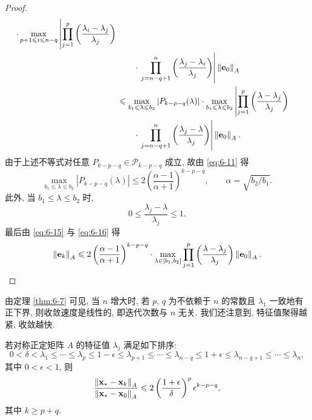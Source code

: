 \begin{proof}
\[\begin{aligned}
      \cdot\max_{p+1\leqslant i\leqslant n-q}\left|\prod_{j=1}^p
      \left(\frac{\lambda_i-\lambda_j}{\lambda_j}\right)\right.\\
    &\qquad\cdot\left.\prod_{j=n-q+1}^n
      \left(\frac{\lambda_j-\lambda_i}{\lambda_j}\right)\right|
      \left\|\mathbf{e}_0\right\|_A\\
    &\leqslant\max_{b_1\leqslant\lambda\leqslant b_2}
      \left|P_{k-p-q}(\lambda)\right|
      \cdot\max_{b_1\leqslant\lambda\leqslant b_2}\left|\prod_{j=1}^p
      \left(\frac{\lambda-\lambda_j}{\lambda_j}\right)\right.\\
    &\qquad\cdot\left.\prod_{j=n-q+1}^n
      \left(\frac{\lambda_j-\lambda}{\lambda_j}\right)\right|
      \left\|\mathbf{e}_0\right\|_A.
  \end{aligned}
\]
由于上述不等式对任意 $P_{k-p-q}\in\mathcal{P}_{k-p-q}$ 成立, 故由 \eqref{eq:6-11} 得
\begin{equation}
  \max_{b_1\leqslant\lambda\leqslant b_2}\left|P_{k-p-q}(\lambda)\right|
  \leqslant2\left(\frac{\alpha-1}{\alpha+1}\right)^{k-p-q},
  \qquad\alpha=\sqrt{b_2/b_1}.
  \label{eq:6-15}
\end{equation}
此外, 当 $b_1\leqslant\lambda\leqslant b_2$ 时,
\begin{equation}
  0\leqslant\frac{\lambda_j-\lambda}{\lambda_j}\leqslant1.
  \label{eq:6-16}
\end{equation}
最后由 \eqref{eq:6-15} 与 \eqref{eq:6-16} 得
\[
  \left\|\mathbf{e}_k\right\|_A
  \leqslant2\left(\frac{\alpha-1}{\alpha+1}\right)^{k-p-q}
  \cdot\max_{\lambda\in[b_1,b_2]}\prod_{j=1}^p
  \left(\frac{\lambda-\lambda_j}{\lambda_j}\right)\left\|\mathbf{e}_0\right\|_A.
  \qedhere
\]
\end{proof}

由定理 \ref{thm:6-7} 可见, 当 $n$ 增大时, 若 $p$, $q$ 为不依赖于 $n$ 的常数且 $\lambda_1$ 一致地有正下界, 则收敛速度是线性的, 即迭代次数与 $n$ 无关. 我们还注意到, 特征值聚得越紧, 收敛越快.

\begin{corollary}
\label{cor:6-1}
若对称正定矩阵 $A$ 的特征值 $\lambda_j$ 满足如下排序:
\[
  0<\delta<\lambda_1\leqslant\cdots\leqslant\lambda_p\leqslant1-\epsilon
  \leqslant\lambda_{p+1}\leqslant\cdots\leqslant\lambda_{n-q}\leqslant1+\epsilon
  \leqslant\lambda_{n-q+1}\leqslant\cdots\leqslant\lambda_n,
\]
其中 $0<\epsilon<1$, 则
\[
  \frac{\left\|\mathbf{x}_*-\mathbf{x}_k\right\|_A}{\left\|\mathbf{x}_*-\mathbf{x}_0\right\|_A}
  \leqslant2\left(\frac{1+\epsilon}{\delta}\right)^p\epsilon^{k-p-q},
\]
其中 $k\geqslant p+q$.
\end{corollary}

